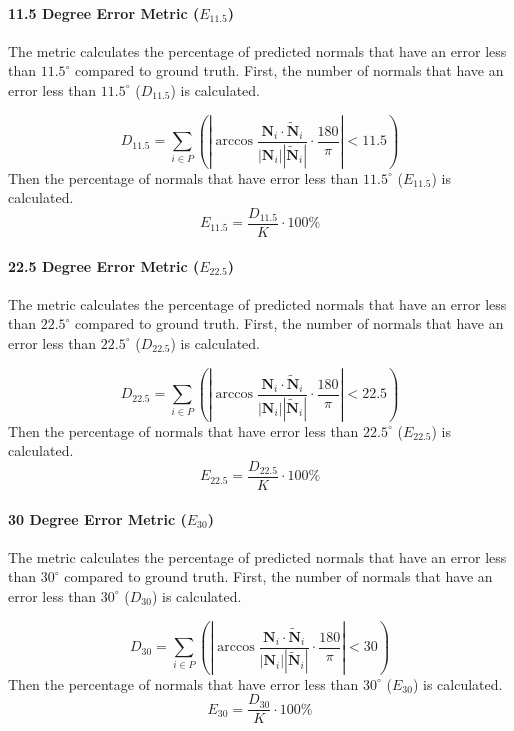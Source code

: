 \paragraph{11.5 Degree Error Metric ($ E_{11.5} $)}
The metric calculates the percentage of predicted normals that have an error less than $ 11.5^\circ $ compared to ground truth. First, the number of normals that have an error less than $ 11.5^\circ $ ($ D_{11.5} $) is calculated.

\[
D_{11.5} = \sum_{i\in P} \left( \left|   \arccos \frac{\textbf{N}_{i}\cdot \tilde{\textbf{N}}_{i}} {| \textbf{N}_{i} |  |\tilde{\textbf{N}}_{i}|  } \cdot  \frac{180}{\pi}   \right| < 11.5 \right)
\]
Then the percentage of normals that have error less than $ 11.5^\circ $ ($ E_{11.5} $) is calculated.
\[ 
E_{11.5} = \frac{D_{11.5}}{K}\cdot 100\%
\]

\paragraph{22.5 Degree Error Metric ($ E_{22.5} $)}
The metric calculates the percentage of predicted normals that have an error less than $ 22.5^\circ $ compared to ground truth. First, the number of normals that have an error less than $ 22.5^\circ $ ($ D_{22.5} $) is calculated.

\[
D_{22.5} = \sum_{i\in P} \left( \left|   \arccos \frac{\textbf{N}_{i}\cdot \tilde{\textbf{N}}_{i}} {| \textbf{N}_{i} |  |\tilde{\textbf{N}}_{i}|  } \cdot  \frac{180}{\pi}   \right| < 22.5 \right)
\]
Then the percentage of normals that have error less than $ 22.5^\circ $ ($ E_{22.5} $) is calculated.
\[ 
E_{22.5} = \frac{D_{22.5}}{K}\cdot 100\%
\]


\paragraph{30 Degree Error Metric ($ E_{30} $)} 
The metric calculates the percentage of predicted normals that have an error less than $ 30^\circ $ compared to ground truth. First, the number of normals that have an error less than $ 30^\circ $ ($ D_{30} $) is calculated.

\[
D_{30} = \sum_{i\in P} \left(\left|   \arccos \frac{\textbf{N}_{i}\cdot \tilde{\textbf{N}}_{i}} {| \textbf{N}_{i} |  |\tilde{\textbf{N}}_{i}|  } \cdot  \frac{180}{\pi}   \right| < 30 \right)
\]
Then the percentage of normals that have error less than $ 30^\circ $ ($ E_{30} $) is calculated.
\[ 
E_{30} = \frac{D_{30}}{K}\cdot 100\%
\]

